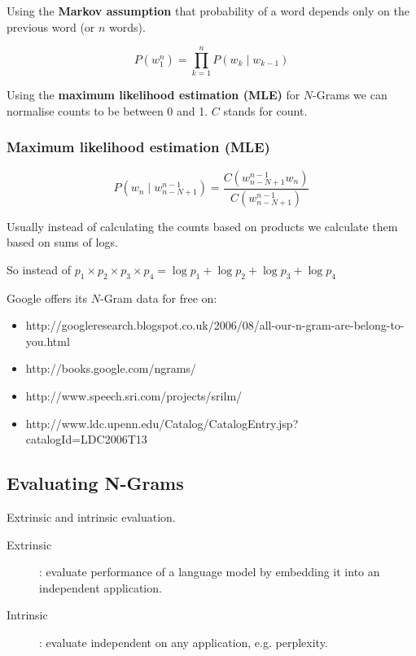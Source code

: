 Using the \textbf{Markov assumption} that probability of a word depends only on the previous word (or $n$ words).

\begin{equation}
P\left(w_1^n \right) = \prod_{k=1}^{n}P\left(w_k \mid w_{k-1}\right)
\end{equation}

Using the \textbf{maximum likelihood estimation (MLE)} for $N$-Grams we can normalise counts to be between 0 and 1. $C$ stands for count.

\subsubsection{Maximum likelihood estimation (MLE)}

\begin{equation}
P\left(w_n \mid w_{n-N+1}^{n-1} \right) = \frac{C\left(w_{n-N+1}^{n-1} w_n \right)}{C\left(w_{n-N+1}^{n-1} \right)}
\end{equation}

Usually instead of calculating the counts based on products we calculate them based on sums of logs.

So instead of  $p_1 \times p_2 \times p_3 \times p_4 = \log p_1 + \log p_2 + \log p_3 + \log p_4$

Google offers its $N$-Gram data for free on:

\begin{itemize}
\item http://googleresearch.blogspot.co.uk/2006/08/all-our-n-gram-are-belong-to-you.html
\item http://books.google.com/ngrams/
\item	http://www.speech.sri.com/projects/srilm/
\item	http://www.ldc.upenn.edu/Catalog/CatalogEntry.jsp?catalogId=LDC2006T13
\end{itemize}

\subsection{Evaluating N-Grams}

Extrinsic and intrinsic evaluation.

\begin{description}
\item [Extrinsic]: evaluate performance of a language model by embedding it into an independent application.
\item [Intrinsic]: evaluate independent on any application, e.g. perplexity.
\end{description}

